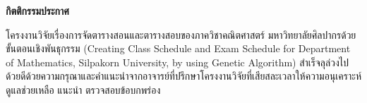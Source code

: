 \newpage
\thispagestyle{empty}
\vspace{2 cm}
{\huge \bf กิตติกรรมประกาศ}
\vspace{2 cm}

โครงงานวิจัยเรื่องการจัดตารางสอนและตารางสอบของภาควิชาคณิตศาสตร์ \;\; มหาวิทยาลัยศิลปากรด้วยขั้นตอนเชิงพันธุกรรม (Creating Class Schedule and Exam Schedule for Department of Mathematics,	Silpakorn University, by using Genetic Algorithm)   สำเร็จลุล่วงไปด้วยดีด้วยความกรุณาและคำแนะนำจากอาจารย์ที่ปรึกษาโครงงานวิจัยที่เสียสละเวลาให้ความอนุเคราะห์ดูแลช่วยเหลือ แนะนำ ตรวจสอบข้อบกพร่อง 


